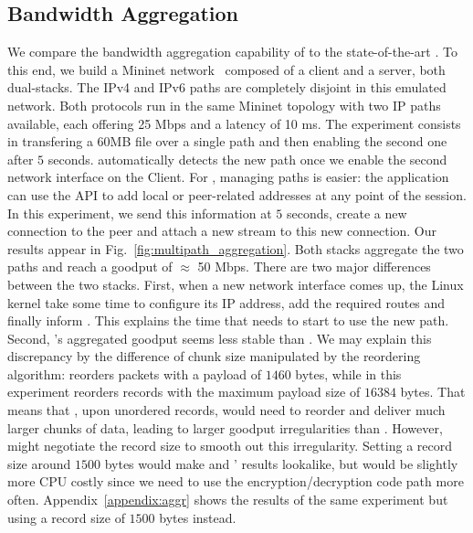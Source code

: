 \subsection{Bandwidth Aggregation}
\label{sec:bwaggr}
We compare the bandwidth aggregation capability of \tcpls to the state-of-the-art
\mptcp. To this end, we build a Mininet network~\cite{handigol2012reproducible}
composed of a client and a server, both
dual-stacks. The IPv4 and IPv6 paths are completely disjoint in this emulated
network. 
Both protocols run in the same Mininet topology with two IP paths available, 
each offering 25 Mbps and a latency of 10 ms.
The experiment consists in transfering
a 60MB file over a single path and then enabling the second one after $5$ seconds.
\mptcp automatically detects the new path once we enable the second network interface
on the Client. For
\tcpls, managing paths is easier: the application can use the API to add local
or peer-related addresses at any point of the session. In this experiment, we send
this information at $5$ seconds, create a new \tcp connection to the peer and
attach a new stream to this new connection. Our results appear in
Fig.~\ref{fig:multipath_aggregation}. Both stacks aggregate the two paths and reach a
goodput of $\approx$ 50 Mbps. There are two major differences between the two stacks.
First, when a new network interface comes up, the Linux kernel take some time to configure its IP address, add the required routes and finally inform \mptcp \cite{paasch2012exploring}.
This explains the time that \mptcp needs to start to use the new path.
Second, \tcpls's aggregated
goodput seems less stable than \mptcp. We may explain this discrepancy by the
difference of chunk size manipulated by the reordering algorithm: \mptcp
reorders packets with a payload of $1460$ bytes, while \tcpls in this experiment
reorders records with the maximum payload size of $16384$ bytes. That means
that \tcpls, upon unordered records, would need to reorder and deliver much
larger chunks of data, leading to larger goodput irregularities than \mptcp.
However, \tcpls might negotiate the record size to smooth out this
irregularity. Setting a record size around $1500$ bytes would make \mptcp and
\tcpls' results lookalike, but would be slightly more CPU costly since we need
to use the encryption/decryption code path more often.
Appendix~\ref{appendix:aggr} shows the results of the same experiment but using
a \tls record size of $1500$ bytes instead.

